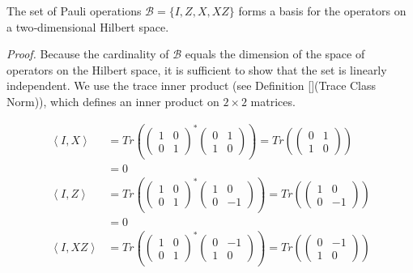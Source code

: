 \begin{theorem}\label{pauli_is_a_base}The set of Pauli operations $\mathcal{B} = \{I, Z, X, XZ\}$ forms a basis for the operators on a two‑dimensional Hilbert space.

\textit{Proof.}\newline
Because the cardinality of $\mathcal{B}$ equals the dimension of the space of operators on the Hilbert space, it is sufficient to show that the set is linearly independent. We use the trace inner product (see Definition [](Trace Class Norm)), which defines an inner product on $2\times 2$ matrices.

\begin{align*}
\left<I, X\right> &= Tr\left( \begin{pmatrix}1 & 0 \\0 & 1\end{pmatrix}^* \begin{pmatrix}0 & 1 \\1 & 0\end{pmatrix} \right) = Tr\left(\begin{pmatrix}0 & 1 \\1 & 0\end{pmatrix}\right)\\
            &= 0\\
\left<I, Z\right> &= Tr\left( \begin{pmatrix}1 & 0 \\0 & 1\end{pmatrix}^* \begin{pmatrix}1 & 0 \\0 & -1\end{pmatrix} \right) = Tr\left(\begin{pmatrix}1 & 0 \\0 & -1\end{pmatrix}\right)\\
            &= 0\\
\left<I, XZ\right> &= Tr\left( \begin{pmatrix}1 & 0 \\0 & 1\end{pmatrix}^* \begin{pmatrix}0 & -1 \\1 & 0\end{pmatrix} \right) = Tr\left(\begin{pmatrix}0 & -1 \\1 & 0\end{pmatrix}\right)\\

\end{align*}
\end{theorem}
